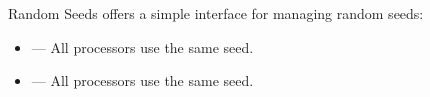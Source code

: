 \begin{frame}
  \begin{block}{Random Seeds}\pause
   offers a simple interface for managing random seeds:
    \begin{itemize}
      \item {} --- All processors use 
the same seed.
      \item {} --- All processors use 
the same seed.
    \end{itemize}
  \end{block}
\end{frame}



% 
% 
%   
% 
% 
% 



